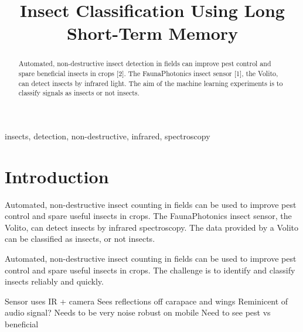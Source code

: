 \documentclass{article}
\title{Insect Classification Using Long Short-Term Memory}
\begin{document}
%

\maketitle
%
\begin{abstract}
Automated, non-destructive insect detection in fields can improve pest control and spare beneficial insects in crops [2]. 
The FaunaPhotonics insect sensor [1], the Volito, can detect insects by infrared light. 
The aim of the machine learning experiments is to classify signals as insects or not insects.
\end{abstract}
%
\begin{keywords}
insects, detection, non-destructive, infrared, spectroscopy
\end{keywords}
%
\section{Introduction}
\label{sec:intro}

Automated, non-destructive insect counting in fields can be used to improve pest control and spare useful insects in crops. The FaunaPhotonics insect sensor, the Volito, can detect insects by infrared spectroscopy. 
The data provided by a Volito can be classified as insects, or not insects. 

Automated, non-destructive insect counting in fields can be used to improve pest control and spare useful insects in crops. The challenge is to identify and classify insects reliably and quickly.

Sensor uses IR + camera
Sees reflections off carapace and wings
Reminicent of audio signal?
Needs to be very noise robust on mobile
Need to see pest vs beneficial









\end{document}
